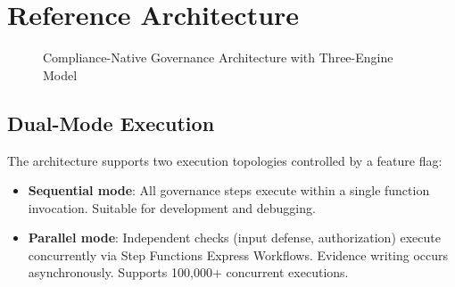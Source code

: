 \documentclass[conference]{IEEEtran}
\begin{document}
\section{Reference Architecture}

\begin{figure}[htbp]
\centering
{}
\caption{Compliance-Native Governance Architecture with Three-Engine Model}
\label{fig:cnga}
\end{figure}

\subsection{Dual-Mode Execution}

The architecture supports two execution topologies controlled by a feature flag:

\begin{itemize}
\item \textbf{Sequential mode}: All governance steps execute within a single function invocation. Suitable for development and debugging.
\item \textbf{Parallel mode}: Independent checks (input defense, authorization) execute concurrently via Step Functions Express Workflows. Evidence writing occurs asynchronously. Supports 100,000+ concurrent executions.
\end{itemize}
\end{document}
